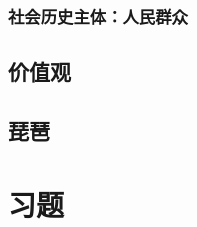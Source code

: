 \documentclass[12pt]{book}
\begin{document}
\section{社会历史主体：人民群众}



\chapter{价值观}






\chapter{琵琶}\label{chapter:琵琶}




















\part{习题}
\end{document}
